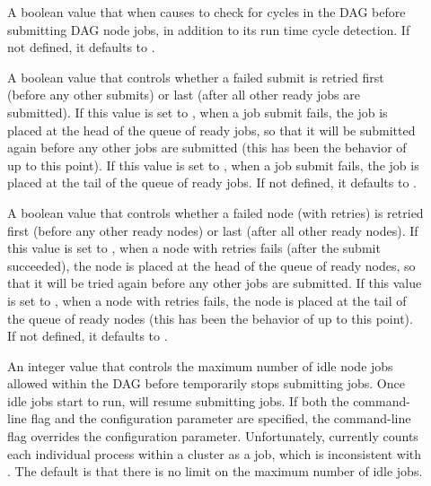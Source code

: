 \begin{description}
\item[]
\label{param:DAGManStartupCycleDetect}
A boolean value that when 
causes  to check for cycles in the DAG before
submitting DAG node jobs,
in addition to its run time cycle detection.
If not defined, it defaults to .

\item[]
\label{param:DAGManRetrySubmitFirst}
A boolean value that controls whether a failed submit is retried first
(before any other submits) or last (after all other ready jobs are
submitted).  If this value is set to , when a job submit
fails, the job is placed at the head of the queue of ready jobs, so
that it will be submitted again before any other jobs are submitted
(this has been the behavior of  up to this point).
If this value is set to , when a job submit fails, the job
is placed at the tail of the queue of ready jobs.
If not defined, it defaults to .

\item[]
\label{param:DAGManRetryNodeFirst}
A boolean value that controls whether a failed node (with retries)
is retried first (before any other ready nodes) or last (after all
other ready nodes).  If this value is set to , when a
node with retries fails (after the submit succeeded), the node is
placed at the head of the queue of ready nodes, so that it will be
tried again before any other jobs are submitted.  If this value is
set to , when a node with retries fails, the node
is placed at the tail of the queue of ready nodes (this has been the
behavior of  up to this point).  If not defined, it
defaults to .

\item[]
\label{param:DAGManMaxJobsIdle}
An integer value that controls the maximum number of idle node jobs
allowed within the DAG before  temporarily stops
submitting jobs.  Once idle jobs start to run,  will
resume submitting jobs.  If both the command-line flag and the
configuration parameter are specified, the command-line flag overrides
the configuration parameter.  Unfortunately,
 currently counts each individual
process within a cluster as a job, which is inconsistent with
.  The default is that there is
no limit on the maximum number of idle jobs.


\end{description}
